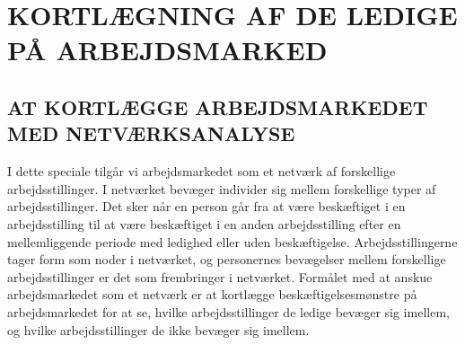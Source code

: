 




\chapter{KORTLÆGNING AF DE LEDIGE PÅ ARBEJDSMARKED} \label{metode}









\section{AT KORTLÆGGE ARBEJDSMARKEDET MED NETVÆRKSANALYSE \label{netvaerksanalyse}}

I dette speciale tilgår vi arbejdsmarkedet som et netværk af forskellige arbejdsstillinger. I netværket bevæger individer sig mellem forskellige typer af arbejdsstillinger. Det sker når en person går fra at være beskæftiget i en arbejdsstilling til at være beskæftiget i en anden arbejdsstilling efter en mellemliggende periode med ledighed eller uden beskæftigelse. Arbejdsstillingerne tager form som noder i netværket, og personernes bevægelser mellem forskellige arbejdsstillinger er det som frembringer  i netværket. Formålet med at anskue arbejdsmarkedet som et netværk er at kortlægge beskæftigelsesmønstre på arbejdsmarkedet for at se, hvilke arbejdsstillinger de ledige bevæger sig imellem, og hvilke arbejdsstillinger de ikke bevæger sig imellem.

